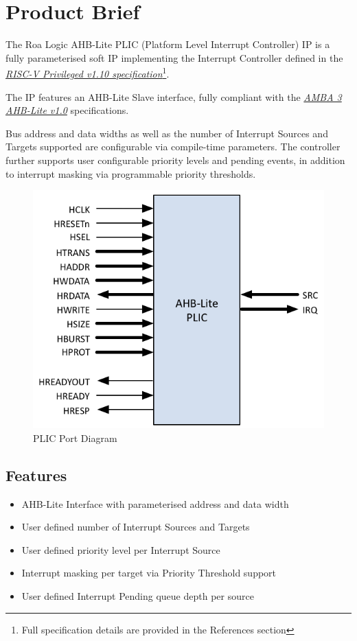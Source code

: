 \chapter{Product Brief}

The Roa Logic AHB-Lite PLIC (Platform Level Interrupt Controller) IP is a fully parameterised soft IP implementing the Interrupt Controller defined in the \emph{\href{https://github.com/riscv/riscv-isa-manual/blob/master/release/riscv-privileged-v1.10.pdf}{RISC-V Privileged v1.10 specification}}\footnote{Full specification details are provided in the References section}.

The IP features an AHB-Lite Slave interface, fully compliant with the \emph{\href{https://www.arm.com/products/system-ip/amba-specifications}{AMBA 3 AHB-Lite v1.0}} specifications.

Bus address and data widths as well as the number of Interrupt Sources and Targets supported are configurable via compile-time parameters. The controller further supports user configurable priority levels and pending events, in addition to interrupt masking via programmable priority thresholds.

\begin{figure}[!htb]
  \includegraphics{assets/img/plic-ports}
  \caption{PLIC Port Diagram}
  \label{fig:PORTDIAG}
\end{figure}

\section{Features}

\begin{itemize}
	\item
		AHB-Lite Interface with parameterised address and data width
	\item
		User defined number of Interrupt Sources and Targets
	\item
		User defined priority level per Interrupt Source
	\item
		Interrupt masking per target via Priority Threshold support
	\item
		User defined Interrupt Pending queue depth per source
\end{itemize}
